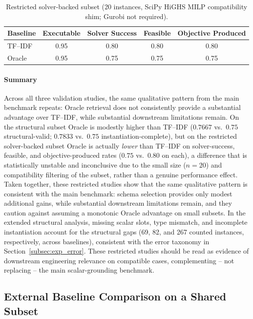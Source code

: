 \documentclass[3p]{elsarticle}
\begin{document}
\begin{table}[t]
\centering
\caption{Restricted solver-backed subset (20 instances, SciPy HiGHS MILP compatibility shim; Gurobi not required).}
\label{tab:eng-solver}
\small
\begin{tabular}{lcccc}
  \toprule
  Baseline & Executable & Solver Success & Feasible & Objective Produced \\
  \midrule
  TF--IDF & 0.95 & 0.80 & 0.80 & 0.80 \\
  Oracle  & 0.95 & 0.75 & 0.75 & 0.75 \\
  \bottomrule
\end{tabular}
\end{table}

\paragraph{Summary} Across all three validation studies, the same qualitative pattern from the main benchmark repeats: Oracle retrieval does not consistently provide a substantial advantage over TF--IDF, while substantial downstream limitations remain. On the structural subset Oracle is modestly higher than TF--IDF ($0.7667$ vs.\ $0.75$ structural-valid; $0.7833$ vs.\ $0.75$ instantiation-complete), but on the restricted solver-backed subset Oracle is actually \emph{lower} than TF--IDF on solver-success, feasible, and objective-produced rates ($0.75$ vs.\ $0.80$ on each), a difference that is statistically unstable and inconclusive due to the small size ($n=20$) and compatibility filtering of the subset, rather than a genuine performance effect. Taken together, these restricted studies show that the same qualitative pattern is consistent with the main benchmark: schema selection provides only modest additional gains, while substantial downstream limitations remain, and they caution against assuming a monotonic Oracle advantage on small subsets. In the extended structural analysis, missing scalar slots, type mismatch, and incomplete instantiation account for the structural gaps (69, 82, and 267 counted instances, respectively, across baselines), consistent with the error taxonomy in Section~\ref{subsec:exp_error}. These restricted studies should be read as evidence of downstream engineering relevance on compatible cases, complementing -- not replacing -- the main scalar-grounding benchmark.

\subsection{External Baseline Comparison on a Shared Subset}
\label{subsec:exp_external}
\end{document}
